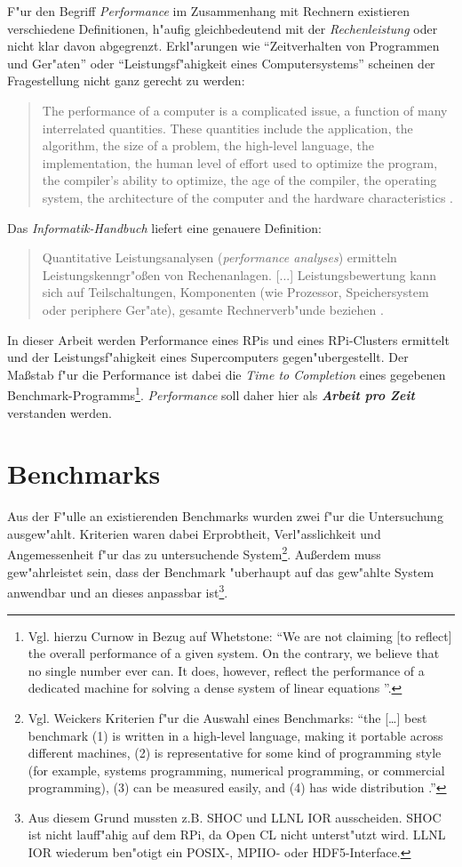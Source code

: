 F"ur den Begriff \textit{Performance} im Zusammenhang mit Rechnern existieren verschiedene Definitionen, h"aufig gleichbedeutend mit der \textit{Rechenleistung} oder nicht klar davon abgegrenzt. Erkl"arungen wie "`Zeitverhalten von Programmen und Ger"aten"' oder "`Leistungsf"ahigkeit eines Computersystems"' scheinen der Fragestellung nicht ganz gerecht zu werden: 
\begin{quote}
\onehalfspacing
The performance of a computer is a complicated issue, a function of many interrelated quantities. These quantities include the application, the algorithm, the size of a problem, the high-level language, the implementation, the human level of effort used to optimize the program, the compiler's ability to optimize, the age of the compiler, the operating system, the architecture of the computer and the hardware characteristics \cite{don03}.
\end{quote}
Das \textit{Informatik-Handbuch} liefert eine genauere Definition:
\begin{quote} 
\onehalfspacing
Quantitative Leistungsanalysen (\textit{performance analyses}) ermitteln Leistungskenngr"o\ss en von Rechenanlagen. [...] Leistungsbewertung kann sich auf Teilschaltungen, Komponenten (wie Prozessor, Speichersystem oder periphere Ger"ate), gesamte Rechnerverb"unde beziehen \cite{rec06}.
\end{quote}
In dieser Arbeit werden Performance eines RPis und eines RPi-Clusters ermittelt und der Leistungsf"ahigkeit eines Supercomputers gegen"ubergestellt. Der Ma\ss stab f"ur die Performance ist dabei die \textit{Time to Completion} eines gegebenen Benchmark-Programms\footnote{Vgl. hierzu Curnow in Bezug auf Whetstone: "`We are not claiming [to reflect] the overall performance of a given system. On the contrary, we believe that no single number ever can. It does, however, reflect the performance of a dedicated machine for solving a dense system of linear equations \cite{cur76}"'.}. \textit{Performance} soll daher hier als \textbf{\textit{Arbeit pro Zeit}} verstanden werden. 

\section{Benchmarks}\label{Benchmarks}

Aus der F"ulle an existierenden Benchmarks wurden zwei f"ur die Untersuchung ausgew"ahlt. Kriterien waren dabei Erprobtheit, Verl"asslichkeit und Angemessenheit f"ur das zu untersuchende System\footnote{Vgl. Weickers Kriterien f"ur die Auswahl eines Benchmarks: "`the [\dots] best benchmark (1) is written in a high-level language, making it portable across different machines, (2) is representative for some kind of programming style (for example, systems programming, numerical programming, or commercial programming), (3) can be measured easily, and (4) has wide distribution \cite{wei90}."'}. Au\ss erdem muss gew"ahrleistet sein, dass der Benchmark "uberhaupt auf das gew"ahlte System anwendbar und an dieses anpassbar ist\footnote{Aus diesem Grund mussten z.B. SHOC und LLNL IOR ausscheiden. SHOC ist nicht lauff"ahig auf dem RPi, da Open CL nicht unterst"utzt wird. LLNL IOR wiederum ben"otigt ein POSIX-, MPIIO- oder HDF5-Interface.}. 

